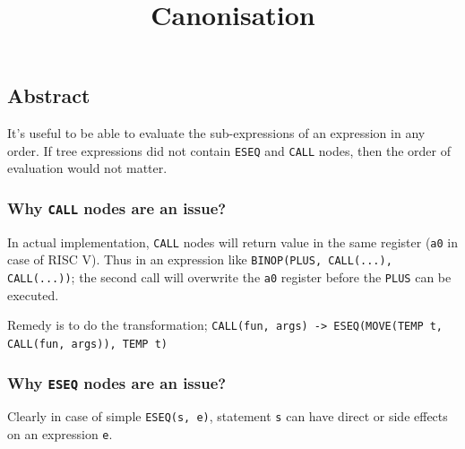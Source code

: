 \documentclass[
]{article}
\title{Canonisation}
\date{}
\begin{document}
\maketitle

\hypertarget{abstract}{%
\subsection{Abstract}\label{abstract}}

It's useful to be able to evaluate the sub-expressions of an expression
in any order. If tree expressions did not contain
\texttt{ESEQ}
and
\texttt{CALL}
nodes, then the order of evaluation would not matter.

\hypertarget{why-call-nodes-are-an-issue}{%
\subsubsection{\texorpdfstring{Why
\texttt{CALL}
nodes are an
issue?}{Why  nodes are an issue?}}\label{why-call-nodes-are-an-issue}}

In actual implementation,
\texttt{CALL}
nodes will return value in the same register
(\texttt{a0} in
case of RISC V). Thus in an expression like
\texttt{BINOP(PLUS, CALL(...), CALL(...))};
the second call will overwrite the
\texttt{a0}
register before the
\texttt{PLUS}
can be executed.

Remedy is to do the transformation;
\texttt{CALL(fun, args) -> ESEQ(MOVE(TEMP t, CALL(fun, args)), TEMP t)}

\hypertarget{why-eseq-nodes-are-an-issue}{%
\subsubsection{\texorpdfstring{Why
\texttt{ESEQ}
nodes are an
issue?}{Why  nodes are an issue?}}\label{why-eseq-nodes-are-an-issue}}

Clearly in case of simple
\texttt{ESEQ(s, e)},
statement
\texttt{s} can
have direct or side effects on an expression
\texttt{e}.
\end{document}

